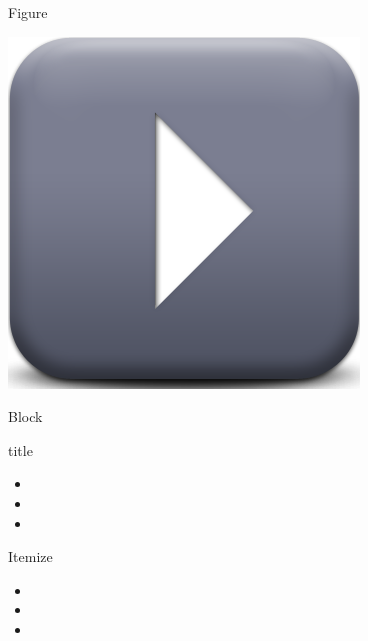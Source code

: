 \begin{frame}{Figure}
\begin{center}
\includegraphics[width=.6\columnwidth]{figures/play} \\
\end{center}
\end{frame}

\begin{frame}{Block}
\begin{block}{title}
\begin{itemize}
\item
\item
\item
\end{itemize}
\end{block}
\end{frame}


\begin{frame}{Itemize}
\begin{itemize}
\item
\item
\item
\end{itemize}
\end{frame}